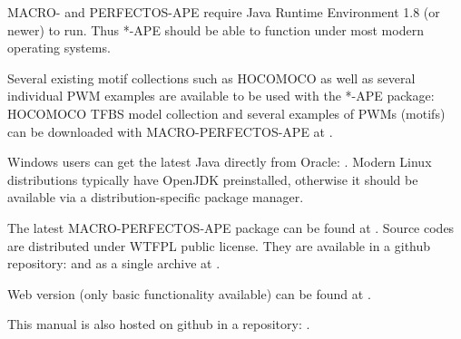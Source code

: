 MACRO- and PERFECTOS-APE require Java Runtime Environment 1.8 (or newer) to run.
Thus *-APE should be able to function under most modern operating systems.

Several existing motif collections such as HOCOMOCO as well as several individual PWM examples are available to be used with the *-APE package:
HOCOMOCO  TFBS model collection and several examples of PWMs (motifs) can be downloaded with MACRO-PERFECTOS-APE at .

Windows users can get the latest Java directly from Oracle: .
Modern Linux distributions typically have OpenJDK preinstalled, otherwise it should be available via a distribution-specific package manager.

The latest MACRO-PERFECTOS-APE package can be found at . Source codes are distributed under WTFPL public license. They are available in a github repository:  and as a single archive at .

Web version (only basic functionality available) can be found at .

This manual is also hosted on github in a repository: .
